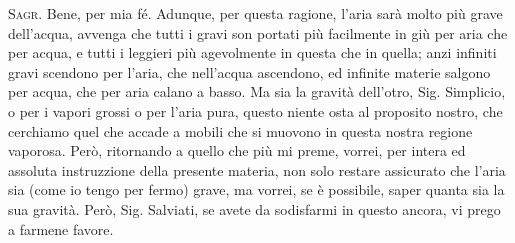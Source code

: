 \documentclass[11pt,twoside,openany]{book}
\newcommand{\speaker}[1]{\textcolor{rubric}{\textsc{#1}}\space}
\begin{document}
\speaker{Sagr.} Bene, per mia fé. Adunque, per questa ragione, l'aria sarà molto più grave dell'acqua, avvenga che tutti i gravi son portati più facilmente in giù per aria che per acqua, e tutti i leggieri più agevolmente in questa che in quella; anzi infiniti gravi scendono per l'aria, che nell'acqua ascendono, ed infinite materie salgono per acqua, che per aria calano a basso. Ma sia la gravità dell'otro, Sig. Simplicio, o per i vapori grossi o per l'aria pura, questo niente osta al proposito nostro, che cerchiamo quel che accade a mobili che si muovono in questa nostra regione vaporosa. Però, ritornando a quello che più mi preme, vorrei, per intera ed assoluta instruzzione della presente materia, non solo restare assicurato che l'aria sia (come io tengo per fermo) grave, ma vorrei, se è possibile, saper quanta sia la sua gravità. Però, Sig. Salviati, se avete da sodisfarmi in questo ancora, vi prego a farmene favore.
\end{document}
